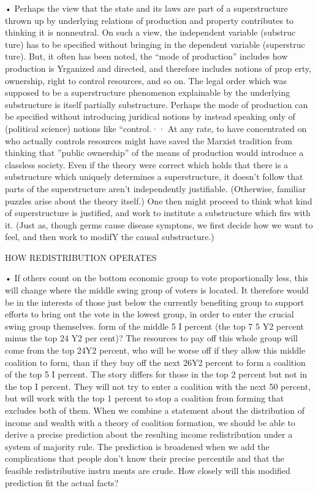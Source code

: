 \documentclass[11pt,openany]{book}
\begin{document}
{• Perhaps the view that the state and its laws are part of a superstructure thrown up by underlying relations of production and property contributes to thinking it is nonneutral. On such a view, the independent variable (substruc ture) has to be specified without bringing in the dependent variable (superstruc ture). But, it often has been noted, the ``mode of production'' includes how production is Yrganized and directed, and therefore includes notions of prop erty, ownership, right to control resources, and so on. The legal order which was supposed to be a superstructure phenomenon explainable by the underlying substructure is itself partially substructure. Perhaps the mode of production can be specified without introducing juridical notions by instead speaking only of (political science) notions like ``control.·· At any rate, to have concentrated on who actually controls resources might have saved the Marxist tradition from thinking that ''public ownership'' of the means of production would introduce a classless society. Even if the theory were correct which holds that there is a substructure which uniquely determines a superstructure, it doesn't follow that parts of the superstructure aren't independently justifiable. (Otherwise, familiar puzzles arise about the theory itself.) One then might proceed to think what kind of superstructure is justified, and work to institute a substructure which firs with it. (Just as, though germs cause disease symptons, we first decide how we want to feel, and then work to modifY the causal substructure.)\par

HOW REDISTRIBUTION OPERATES\par

• If others count on the bottom economic group to vote proportionally less, this will change where the middle swing group of voters is located. It therefore would be in the interests of those just below the currently benefiting group to support efforts to bring out the vote in the lowest group, in order to enter the crucial swing group themselves. form of the middle 5 I percent (the top 7 5 Y2 percent minus the top 24 Y2 per cent)? The resources to pay off this whole group will come from the top 24Y2 percent, who will be worse off if they allow this middle coalition to form, than if they buy off the next 26Y2 percent to form a coalition of the top 5 I percent. The story differs for those in the top 2 percent but not in the top I percent. They will not try to enter a coalition with the next 50 percent, but will work with the top 1 percent to stop a coalition from forming that excludes both of them. When we combine a statement about the distribution of income and wealth with a theory of coalition formation, we should be able to derive a precise prediction about the resulting income redistribution under a system of majority rule. The prediction is broadened when we add the complications that people don't know their precise percentile and that the feasible redistributive instru ments are crude. How closely will this modified prediction fit the actual facts?\par

}
\end{document}
